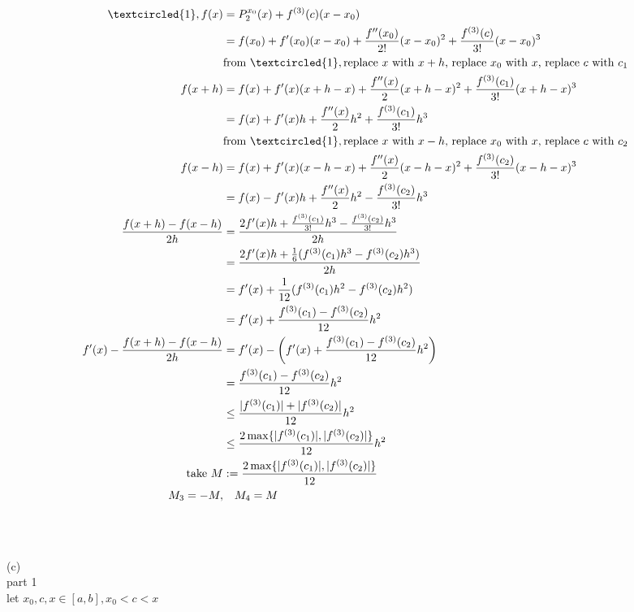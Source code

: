 \documentclass[12pt, border = 4pt, multi]{article} %
\begin{document}
\begin{align*}
\textcircled{1}, f(x) &= P_2 ^ {x_0}(x) + f ^ {(3)}(c)(x - x_0)\\
&= f(x_0) + f'(x_0)(x - x_0) + \frac{f''(x_0)}{2!}(x - x_0) ^ 2 + \frac{f ^ {(3)}(c)}{3!}(x - x_0) ^ 3\\
&\text{from }\textcircled{1}, \text{replace $x$ with $x + h$, replace $x_0$ with $x$, replace $c$ with $c_1$}\\
f(x + h) &= f(x) + f'(x)(x + h - x) + \frac{f''(x)}{2}(x + h - x) ^ 2 + \frac{f ^ {(3)}(c_1)}{3!}(x + h - x) ^ 3\\
&= f(x) + f'(x)h + \frac{f''(x)}{2}h ^ 2 + \frac{f ^ {(3)}(c_1)}{3!}h ^ 3\\
&\text{from }\textcircled{1}, \text{replace $x$ with $x - h$, replace $x_0$ with $x$, replace $c$ with $c_2$}\\
f(x - h) &= f(x) + f'(x)(x - h - x) + \frac{f''(x)}{2}(x - h - x) ^ 2 + \frac{f ^ {(3)}(c_2)}{3!}(x - h - x) ^ 3\\
&= f(x) - f'(x)h + \frac{f''(x)}{2}h ^ 2 - \frac{f ^ {(3)}(c_2)}{3!} h ^ 3\\
\frac{f(x + h) - f(x - h)}{2h} &= \frac{2f'(x)h + \frac{f ^ {(3)}(c_1)}{3!}h ^ 3 - \frac{f ^ {(3)}(c_2)}{3!} h ^ 3}{2h}\\
&= \frac{2f'(x)h + \frac{1}{6}(f ^ {(3)}(c_1)h ^ 3 - f ^ {(3)}(c_2)h ^ 3)}{2h}\\
&= f'(x) + \frac{1}{12}(f ^ {(3)}(c_1)h ^ 2 - f ^ {(3)}(c_2)h ^ 2)\\
&= f'(x) + \frac{f ^ {(3)}(c_1) - f ^ {(3)}(c_2)}{12}h ^ 2\\
f'(x) - \frac{f(x + h) - f(x - h)}{2h} &= f'(x) - \left(f'(x) + \frac{f ^ {(3)}(c_1) - f ^ {(3)}(c_2)}{12}h ^ 2\right)\\
&= \frac{f ^ {(3)}(c_1) - f ^ {(3)}(c_2)}{12}h ^ 2\\
&\leq \frac{|f ^ {(3)}(c_1)| + |f ^ {(3)}(c_2)|}{12}h ^ 2\\
&\leq \frac{2 \max\{|f ^ {(3)}(c_1)|, |f ^ {(3)}(c_2)|\}}{12}h ^ 2\\
\text{take } M &:= \frac{2 \max\{|f ^ {(3)}(c_1)|, |f ^ {(3)}(c_2)|\}}{12}\\
M_3 = -M, &\quad M_4 = M\\
\end{align*}
\\
\\
\\
(c)\\
part 1\\
let $x_0, c, x \in [a, b], x_0 < c < x$\\
\end{document}
